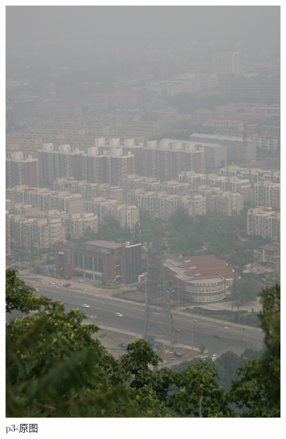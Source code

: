 \documentclass[12pt]{article}
\begin{document}
 \begin{figure}[!h]
    \centering
    \begin{minipage}[t]{0.24\linewidth}
        \centering
        \includegraphics[width=0.9\linewidth]{sample_pictures/p3.jpg}
        \caption*{p3-原图}
    \end{minipage}
    \begin{minipage}[t]{0.24\linewidth}
        \centering

\end{minipage}
\end{figure}
\end{document}

